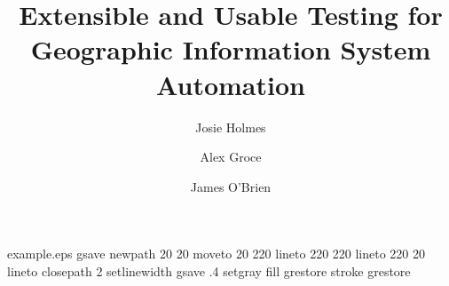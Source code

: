 %
%
%
%
%
\begin{filecontents*}{example.eps}
gsave
newpath
  20 20 moveto
  20 220 lineto
  220 220 lineto
  220 20 lineto
closepath
2 setlinewidth
gsave
  .4 setgray fill
grestore
stroke
grestore
\end{filecontents*}
%
\RequirePackage{fix-cm}
%
\documentclass[smallextended]{svjour3}       %
%
\smartqed  %
%
\usepackage{graphicx}
\usepackage{code}
\usepackage{xcolor}
%
%
%
%
%


\title{Extensible and Usable Testing for Geographic Information System Automation}


\author{Josie Holmes         \and
  Alex Groce           \and
  James O'Brien
}



